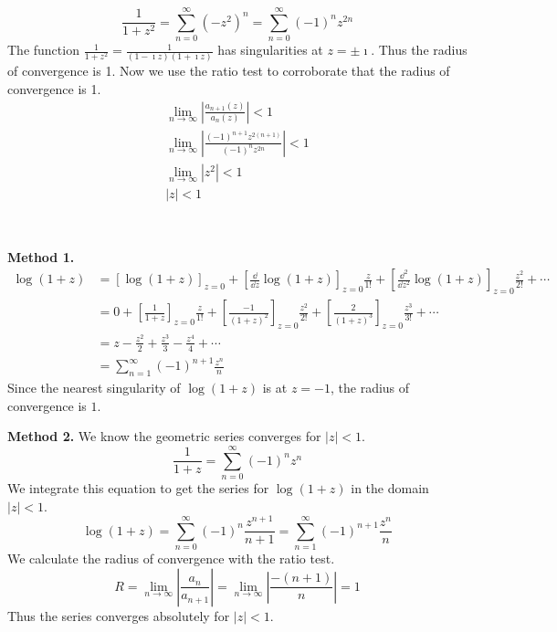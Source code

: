 {%


\begin{Solution}
  \label{solution taylor 1/(1+z^2)}
  \[
  \frac{1}{1 + z^2} = \sum_{n = 0}^\infty \left( - z^2 \right)^n = \sum_{n = 0}^\infty (-1)^n z^{2n}
  \]
  The function $\frac{1}{1 + z^2} = \frac{1}{(1 - \imath z)(1 + \imath z)}$ 
  has singularities
  at $z = \pm \imath$.  Thus the radius of convergence is 1.  Now we use the 
  ratio test to corroborate that the radius of convergence is 1.
  \begin{gather*}
    \lim_{n \to \infty} \left| \frac{a_{n+1}(z)}{a_n(z)} \right| < 1 
    \\
    \lim_{n \to \infty} \left| \frac{(-1)^{n+1} z^{2 (n+1)}}{(-1)^n z^{2 n}} \right| < 1 
    \\
    \lim_{n \to \infty} \left|  z^2 \right| < 1 
    \\
    |z| < 1
  \end{gather*}
\end{Solution}



\begin{Solution} $\phantom{a}$
  \label{solution taylor log(1+z)}

  \textbf{Method 1.}
  \begin{align*}
    \log (1 + z) &= [ \log(1 + z) ]_{z=0} 
    + \left[ \frac{\dd}{\dd z} \log(1 + z) \right]_{z = 0}  \frac{z}{1!} +
    \left[ \frac{\dd^2}{\dd z^2} \log(1 + z) \right]_{z = 0} \frac{z^2}{2!}
    + \cdots 
    \\
    &= 0 + \left[ \frac{1}{1 + z} \right]_{z = 0} \frac{z}{1!} +
    \left[ \frac{-1}{(1 + z)^2} \right]_{z = 0} \frac{z^2}{2!} +
    \left[ \frac{2}{(1 + z)^3} \right]_{z = 0} \frac{z^3}{3!} +
    \cdots 
    \\
    &= z - \frac{z^2}{2} + \frac{z^3}{3} - \frac{z^4}{4} + \cdots 
    \\
    &= \sum_{n = 1}^\infty (-1)^{n+1} \frac{z^n}{n}
  \end{align*}
  Since the nearest singularity of $\log(1 + z)$ is at $z = -1$, the radius of
  convergence is $1$.

  \textbf{Method 2.}
  We know the geometric series converges for $|z| < 1$.  
  \[
  \frac{1}{1 + z} = \sum_{n = 0}^\infty (-1)^n z^n
  \]
  We integrate this equation to get the series for $\log(1 + z)$
  in the domain $|z| < 1$.
  \[
  \log(1 + z) = \sum_{n = 0}^\infty (-1)^n \frac{z^{n + 1}}{n + 1}
  = \sum_{n = 1}^\infty (-1)^{n+1} \frac{z^n}{n}
  \]
  We calculate the radius of convergence with the ratio test.
  \[
  R = \lim_{n \to \infty} \left| \frac{a_n}{a_{n+1}} \right|
  = \lim_{n \to \infty} \left| \frac{-(n + 1)}{n} \right| = 1
  \]
  Thus the series converges absolutely for $|z| < 1$.
\end{Solution}



}
